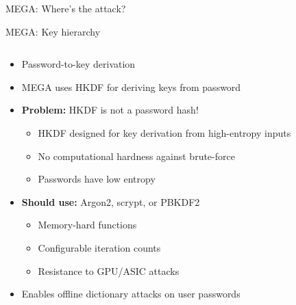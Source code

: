 \documentclass[aspectratio=169, lualatex, handout]{beamer}
\begin{document}
\begin{frame}{MEGA: Where's the attack?}
\end{frame}

\begin{frame}{MEGA: Key hierarchy}
	\begin{columns}[c]
		\begin{column}{1\textwidth}
			\begin{itemize}
				\item Password-to-key derivation
				\item MEGA uses HKDF for deriving keys from password
				\item \textbf{Problem:} HKDF is not a password hash!
				      \begin{itemize}
					      \item HKDF designed for key derivation from high-entropy inputs
					      \item No computational hardness against brute-force
					      \item Passwords have low entropy
				      \end{itemize}
				\item \textbf{Should use:} Argon2, scrypt, or PBKDF2
				      \begin{itemize}
					      \item Memory-hard functions
					      \item Configurable iteration counts
					      \item Resistance to GPU/ASIC attacks
				      \end{itemize}
				\item Enables offline dictionary attacks on user passwords
			\end{itemize}
		\end{column}
	\end{columns}
\end{frame}
\end{document}

